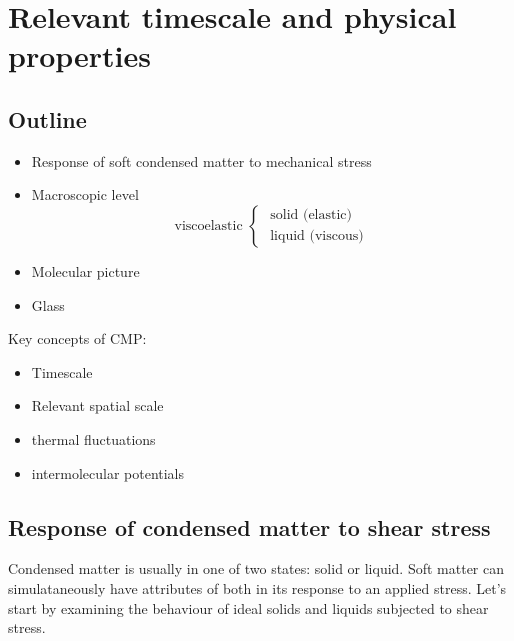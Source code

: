 \documentclass[a4paper, 11pt, normalem]{report}
\begin{document}
\chapter{Relevant timescale and physical properties}
\section{Outline}
\begin{itemize}
    \item Response of soft condensed matter to mechanical stress
    \item Macroscopic level
        \begin{equation*}
            \text{viscoelastic } \begin{cases} \text{ solid (elastic)} \\ \text{ liquid (viscous)}\end{cases}
        \end{equation*}
    \item Molecular picture
    \item Glass
\end{itemize}

Key concepts of CMP:
\begin{itemize}
    \item Timescale
    \item Relevant spatial scale
    \item thermal fluctuations
    \item intermolecular potentials
\end{itemize}

\section{Response of condensed matter to shear stress}
Condensed matter is usually in one of two states: solid or liquid.
Soft matter can simulataneously have attributes of both in its response to an applied stress.
Let's start by examining the behaviour of ideal solids and liquids subjected to shear stress.
\end{document}
